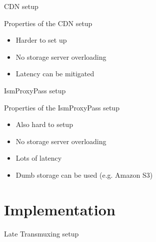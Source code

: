 \documentclass[xcolor=svgnames]{beamer}
\begin{document}
\begin{frame}{CDN setup}
    \begin{figure}

        \resizebox{\textwidth}{!}{%
            
        }
    \end{figure}
\end{frame}

\begin{frame}{Properties of the CDN setup}
  \begin{itemize}
  \item Harder to set up
  \item No storage server overloading
  \item Latency can be mitigated
  \end{itemize}
\end{frame}

\begin{frame}{IsmProxyPass setup}
    \begin{figure}

        \resizebox{\textwidth}{!}{%
            
        }
    \end{figure}
\end{frame}

\begin{frame}{Properties of the IsmProxyPass setup}
  \begin{itemize}
  \item Also hard to setup
  \item No storage server overloading
  \item Lots of latency
  \item Dumb storage can be used (e.g. Amazon S3)
  \end{itemize}
\end{frame}


\section{Implementation}

\begin{frame}{Late Transmuxing setup}
    \begin{figure}

        \resizebox*{!}{\dimexpr\textheight-2\baselineskip\relax}{%
            
        }
    \end{figure}

\end{frame}
\end{document}
